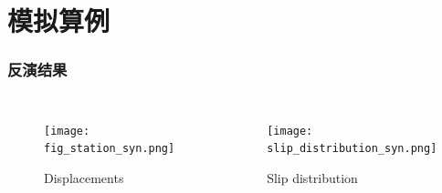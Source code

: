 ﻿\documentclass{beamer}
\begin{document}
\section{模拟算例}
\begin{frame}
\frametitle{反演结果}
\begin{columns}

\begin{minipage}[c][0.4\textheight][c]{\linewidth}
\begin{figure}
  \centering
  \texttt{[image: fig\_station\_syn.png]}\\
  \caption{Displacements}\label{fig_station_syn}
\end{figure}
\end{minipage}

\begin{minipage}[c][0.4\textheight][c]{\linewidth}
\begin{figure}
  \centering
  \texttt{[image: slip\_distribution\_syn.png]}\\
  \caption{Slip distribution}\label{Fig:slip_distribution_syn}
\end{figure}
\end{minipage}

\end{columns}

\end{frame}
\end{document}
